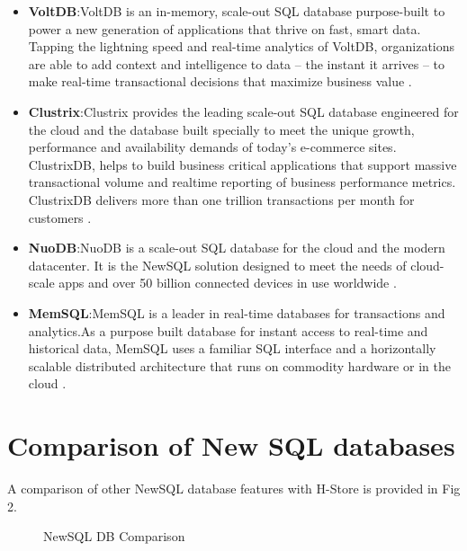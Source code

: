 \documentclass[9pt,twocolumn,twoside]{../../styles/osajnl}
\begin{document}
\begin{itemize}
\item \textbf{VoltDB}:VoltDB is an in-memory, scale-out SQL database purpose-built to power a new
generation of applications that thrive on fast, smart data. Tapping the lightning
speed and real-time analytics of VoltDB, organizations are able to add context
and intelligence to data – the instant it arrives – to make real-time transactional
decisions that maximize business value \cite{www-VoltDB}.

\item \textbf{Clustrix}:Clustrix provides the leading scale-out SQL database engineered for the cloud
and the database built specially to meet the unique growth, performance and
availability demands of today’s e-commerce sites. ClustrixDB, helps to build
business critical applications that support massive transactional volume and realtime
reporting of business performance metrics. ClustrixDB delivers more than
one trillion transactions per month for customers \cite{www-ClustrixDB}.

\item \textbf{NuoDB}:NuoDB is a scale-out SQL database for the cloud and the modern datacenter. It is
the NewSQL solution designed to meet the needs of cloud-scale apps and over
50 billion connected devices in use worldwide \cite{www-NuoDB}.

\item \textbf{MemSQL}:MemSQL is a leader in real-time databases for transactions and analytics.As a
purpose built database for instant access to real-time and historical data,
MemSQL uses a familiar SQL interface and a horizontally scalable distributed
architecture that runs on commodity hardware or in the cloud \cite{www-Memsql}.
\end{itemize}

\section{Comparison of New SQL databases}

A comparison of other NewSQL  database features with H-Store is provided in Fig 2.
\begin{figure}[]
\centering
\graphicspath{ {images/} }
\caption{NewSQL DB Comparison} \cite{pavlo16}
\label{fig:false-color}
\end{figure}
\end{document}
